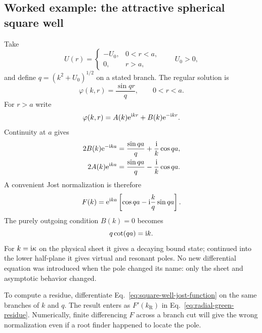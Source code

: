 \subsection{Worked example: the attractive spherical square well}
\label{subsec:square-well-jost}

Take
\begin{equation}
  U(r)=
  \begin{cases}
    -U_0,&0<r<a,\\
    0,&r>a,
  \end{cases}
  \qquad U_0>0,
  \label{eq:square-well-potential}
\end{equation}
and define $q=(k^2+U_0)^{1/2}$ on a stated branch.  The regular solution is
\begin{equation}
  \varphi(k,r)=\frac{\sin qr}{q},
  \qquad 0<r<a.
  \label{eq:square-well-regular-inside}
\end{equation}
For $r>a$ write
\begin{equation}
  \varphi(k,r)=A(k)\mathrm{e}^{\mathrm{i} kr}+B(k)\mathrm{e}^{-\mathrm{i} kr}.
  \label{eq:square-well-outside}
\end{equation}
Continuity at $a$ gives
\begin{align}
  2B(k)\mathrm{e}^{-\mathrm{i} ka}
  &=\frac{\sin qa}{q}+\frac{\mathrm{i}}{k}\cos qa,
  \label{eq:square-well-incoming-coefficient}\\
  2A(k)\mathrm{e}^{\mathrm{i} ka}
  &=\frac{\sin qa}{q}-\frac{\mathrm{i}}{k}\cos qa.
  \label{eq:square-well-outgoing-coefficient}
\end{align}
A convenient Jost normalization is therefore
\begin{equation}
  F(k)=\mathrm{e}^{\mathrm{i} ka}
  \left[\cos qa-\mathrm{i}\frac{k}{q}\sin qa\right].
  \label{eq:square-well-jost-function}
\end{equation}
The purely outgoing condition $B(k)=0$ becomes
\begin{equation}
  q\cot(qa)=\mathrm{i} k.
  \label{eq:square-well-resonance-condition}
\end{equation}
For $k=\mathrm{i}\kappa$ on the physical sheet it gives a decaying bound state;
continued into the lower half-plane it gives virtual and resonant poles.
No new differential equation was introduced when the pole changed its name:
only the sheet and asymptotic behavior changed.

To compute a residue, differentiate Eq.~\eqref{eq:square-well-jost-function}
on the same branches of $k$ and $q$.  The result enters as
$F'(k_{\mathrm R})$ in Eq.~\eqref{eq:radial-green-residue}.  Numerically,
finite differencing $F$ across a branch cut will give the wrong normalization
even if a root finder happened to locate the pole.

